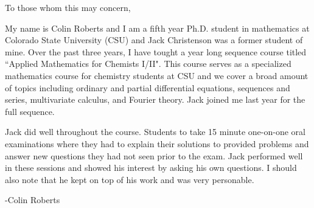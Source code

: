 \documentclass{article}
\begin{document}
\noindent To those whom this may concern,

My name is Colin Roberts and I am a fifth year Ph.D. student in mathematics at Colorado State University (CSU) and Jack Christenson was a former student of mine. Over the past three years, I have tought a year long sequence course titled ``Applied Mathematics for Chemists I/II". This course serves as a specialized mathematics course for chemistry students at CSU and we cover a broad amount of topics including ordinary and partial differential equations, sequences and series, multivariate calculus, and Fourier theory. Jack joined me last year for the full sequence.

Jack did well throughout the course. Students to take 15 minute one-on-one oral examinations where they had to explain their solutions to provided problems and answer new questions they had not seen prior to the exam. Jack performed well in these sessions and showed his interest by asking his own questions. I should also note that he kept on top of his work and was very personable.


\noindent -Colin Roberts
\end{document}
